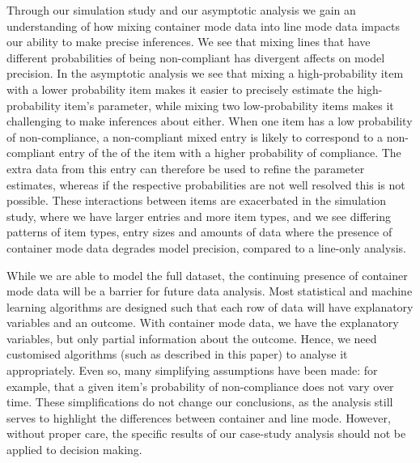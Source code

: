 \documentclass[aoas]{imsart}
\begin{document}
Through our simulation study and our asymptotic analysis we gain an understanding of how mixing container mode data into line mode data impacts our ability to make precise inferences. We see that mixing lines that have different probabilities of being non-compliant has divergent affects on model precision. In the asymptotic analysis we see that mixing a high-probability item with a lower probability item makes it easier to precisely estimate the high-probability item's parameter, while mixing two low-probability items makes it challenging to make inferences about either.  {When one item has a low probability of non-compliance, a non-compliant mixed entry is likely to correspond to a non-compliant entry of the of the item with a higher probability of compliance.  The extra data from this entry can therefore be used to refine the parameter estimates, whereas if the respective probabilities are not well resolved this is not possible.} These interactions between items are exacerbated in the simulation study, where we have larger entries and more item types, and we see differing patterns of item types, entry sizes and amounts of data where the presence of container mode data degrades model precision, compared to a line-only analysis. 

While we are able to model the full dataset, the continuing presence of container mode data will be a barrier for future data analysis. Most statistical and machine learning algorithms are designed such that each row of data will have explanatory variables and an outcome. With container mode data, we have the explanatory variables, but only partial information about the outcome. Hence, we need customised algorithms (such as described in this paper) to analyse it appropriately.  {Even so, many simplifying assumptions have been made: for example, that a given item's probability of non-compliance does not vary over time. These simplifications do not change our conclusions, as the analysis still serves to highlight the differences between container and line mode. However, without proper care, the specific results of our case-study analysis should not be applied to decision making.} %
\end{document}
